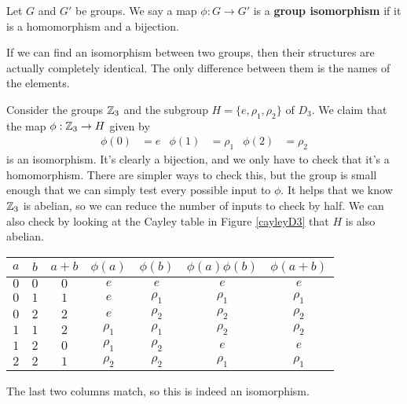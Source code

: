 \begin{definition}
Let $G$ and $G'$ be groups. We say a map $\phi: G \to G'$ is a \textbf{group isomorphism} if it is a homomorphism and a bijection.
\end{definition}

If we can find an isomorphism between two groups, then their structures are actually completely identical. The only difference between them is the names of the elements.

\begin{example}
Consider the groups $\zn[3]$ and the subgroup $H = \{e, \rho_1, \rho_2\}$ of $D_3$. We claim that the map $\phi: \zn[3] \to H$ given by
\begin{align*}
    \phi(0) &= e & \phi(1) &= \rho_1 & \phi(2) &= \rho_2
\end{align*}
is an isomorphism. It's clearly a bijection, and we only have to check that it's a homomorphism. There are simpler ways to check this, but the group is small enough that we can simply test every possible input to $\phi$. It helps that we know $\zn[3]$ is abelian, so we can reduce the number of inputs to check by half. We can also check by looking at the Cayley table in Figure \ref{cayleyD3} that $H$ is also abelian.

\begin{center}
    \begin{tabular}{c c c c c c c}
        $a$ & $b$ & $a+b$ & $\phi(a)$ & $\phi(b)$ & $\phi(a)\phi(b)$ & $\phi(a+b)$ \\
        \hline
        $0$ & $0$ & $0$   & $e$       & $e$       & $e$              & $e$        \\
        $0$ & $1$ & $1$   & $e$       & $\rho_1$  & $\rho_1$         & $\rho_1$   \\
        $0$ & $2$ & $2$   & $e$       & $\rho_2$  & $\rho_2$         & $\rho_2$   \\
        $1$ & $1$ & $2$   & $\rho_1$  & $\rho_1$  & $\rho_2$         & $\rho_2$   \\
        $1$ & $2$ & $0$   & $\rho_1$  & $\rho_2$  & $e$              & $e$        \\
        $2$ & $2$ & $1$   & $\rho_2$  & $\rho_2$  & $\rho_1$         & $\rho_1$   \\
    \end{tabular}
\end{center}

The last two columns match, so this is indeed an isomorphism.
\end{example}

